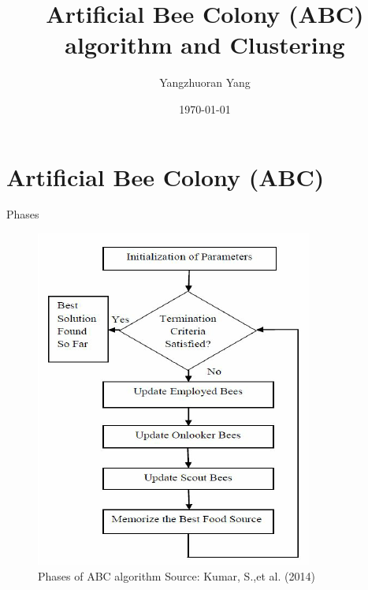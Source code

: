 \documentclass[14pt,ignorenonframetext,compress]{beamer}
\title[]{Artificial Bee Colony (ABC) algorithm and Clustering}
\author[
        Yangzhuoran Yang
    ]{Yangzhuoran Yang}
\date[
      \today
  ]{
      \today
        }
\begin{document}
  \begin{frame}[plain]
  \titlepage
  \end{frame}



\hypertarget{artificial-bee-colony-abc}{%
\section{Artificial Bee Colony (ABC)}\label{artificial-bee-colony-abc}}

\begin{frame}{Phases}
\protect\hypertarget{phases}{}

\begin{figure}
\includegraphics[width=0.5\linewidth]{ABC} \caption{Phases of ABC algorithm
 Source: Kumar, S.,et al. (2014)}\label{fig:ABC}
\end{figure}

\end{frame}
\end{document}

